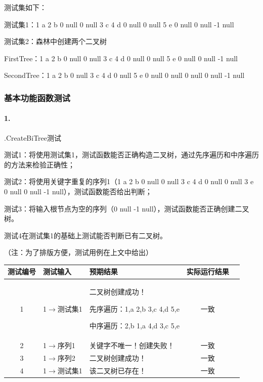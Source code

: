 \documentclass[supercite]{Experimental_Report}
\theoremstyle{definition}
\begin{document}
测试集如下：

测试集1：1 a 2 b 0 null  0 null 3 c 4 d  0 null  0 null 5 e  0 null  0 null -1 null

测试集2：森林中创建两个二叉树

FirstTree：1 a 2 b 0 null  0 null 3 c 4 d  0 null  0 null 5 e  0 null  0 null -1 null

SecondTree：1 a 2 b 0 null    3 c 4 d  0 null  5 e  0 null 0 null  0 null   0 null -1 null

\setcounter{paragraph}{0}

\subsubsection{基本功能函数测试}

\paragraph{ 1.}.CreateBiTree测试

测试1：将使用测试集1，测试函数能否正确构造二叉树，通过先序遍历和中序遍历的方法来检验正确性；

测试2：将使用关键字重复的序列1（1 a 2 b 0 null 0 null 3 c 4 d 0 null  0 null 3 e 0 null 0 null -1 null），测试函数能否给出判断；

测试3：将输入根节点为空的序列（0 null -1 null），测试函数能否正确创建二叉树。

测试4在测试集1的基础上测试能否判断已有二叉树。

（注：为了排版方便，测试用例在上文中给出）

\vspace{0.5em}

\begin{tabular}{|c|l|p{6cm}|c|c|}
	\hline
	测试编号 & 测试输入 & 预期结果 & 实际运行结果 \\
	\hline
	1 & 1$\rightarrow$测试集1 & 二叉树创建成功！

先序遍历：1,a 2,b 3,c 4,d 5,e

中序遍历：2,b 1,a 4,d 3,c 5,e & 一致 \\
	\hline
	2 & 1$\rightarrow$序列1 & 关键字不唯一！创建失败！ & 一致 \\
	\hline
	3 & 1$\rightarrow$序列2 & 二叉树创建成功！ & 一致 \\
	\hline
	4 & 1$\rightarrow$测试集1 & 该二叉树已存在！ & 一致 \\
	\hline
\end{tabular}

~\
\end{document}
